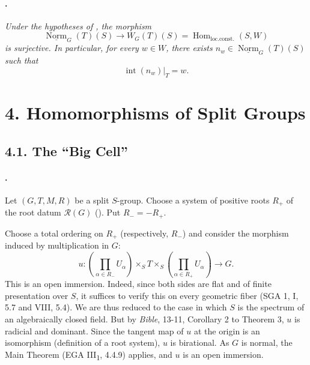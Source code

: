 \paragraph{.}
\textit{Under the hypotheses of , the morphism}
\[
  \underline{\operatorname{Norm}}_G(T)(S)
  \longrightarrow
  W_G(T)(S)
  =
  \operatorname{Hom}_{\mathrm{loc.const.}}(S,W)
\]
\textit{is surjective. In particular, for every \(w\in W\), there
exists \(n_w\in\underline{\operatorname{Norm}}_G(T)(S)\) such that}
\[
  \operatorname{int}(n_w)|_T=w.
\]

\section*{4. Homomorphisms of Split Groups}

\subsection*{4.1. The ``Big Cell''}

\paragraph{.}
Let \((G,T,M,R)\) be a split \(S\)-group. Choose a system
of positive roots \(R_+\) of the root datum \(\mathcal R(G)\)
\textup{()}. Put \(R_-=-R_+\).

Choose a total ordering on \(R_+\) \textup{(respectively, \(R_-\))}
and consider the morphism induced by multiplication in \(G\):
\[
  u:
  \left(\prod_{\alpha\in R_-}U_\alpha\right)
  \times_S T
  \times_S
  \left(\prod_{\alpha\in R_+}U_\alpha\right)
  \longrightarrow G.
\]
This is an open immersion. Indeed, since both sides are flat and of
finite presentation over \(S\), it suffices to verify this on every
geometric fiber \textup{(SGA 1, I, 5.7 and VIII, 5.4)}. We are thus
reduced to the case in which \(S\) is the spectrum of an
algebraically closed field. But by \emph{Bible}, 13-11,
Corollary 2 to Theorem 3, \(u\) is radicial and dominant. Since the
tangent map of \(u\) at the origin is an isomorphism
\textup{(definition of a root system)}, \(u\) is birational. As
\(G\) is normal, the Main Theorem
\textup{(EGA III\textsubscript{1}, 4.4.9)} applies, and \(u\) is an
open immersion.

